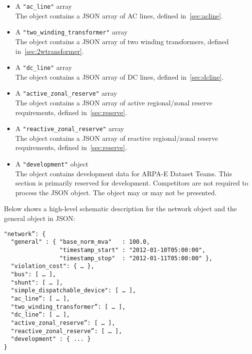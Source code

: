 \begin{itemize}
    \item A \texttt{"ac\_line"} array\\
    The object contains a JSON array of AC lines, defined in~\ref{sec:acline}.
    \item A \texttt{"two\_winding\_transformer"} array\\
    The object contains a JSON array of two winding transformers, defined in~\ref{sec:2wtransformer}.
    \item A \texttt{"dc\_line"} array\\
    The object contains a JSON array of DC lines, defined in~\ref{sec:dcline}.
    \item A \texttt{"active\_zonal\_reserve"} array\\
    The object contains a JSON array of active regional/zonal reserve requirements, defined in~\ref{sec:reserve}.
    \item A \texttt{"reactive\_zonal\_reserve"} array\\
    The object contains a JSON array of reactive regional/zonal reserve requirements, defined in~\ref{sec:reserve}.
    \item A \texttt{"development"} object\\
    The object contains development data for ARPA-E Dataset Teams. This section is primarily reserved for development. Competitors are not required to process the JSON object. The object may or may not be presented. 
\end{itemize}

Below shows a high-level schematic description for the network object and the general object in JSON:
\begin{verbatim}
"network”: {
  "general" : { "base_norm_mva"   : 100.0,
                "timestamp_start" : "2012-01-10T05:00:00",
                "timestamp_stop"  : "2012-01-11T05:00:00" },
  "violation_cost": { … },
  "bus": [ … ],
  "shunt": [ … ],
  "simple_dispatchable_device": [ … ],
  "ac_line”: [ … ],
  "two_winding_transformer”: [ … ],
  "dc_line”: [ … ],   
  "active_zonal_reserve”: [ … ],
  "reactive_zonal_reserve”: [ … ],
  "development" : { ... }
}    
\end{verbatim}

